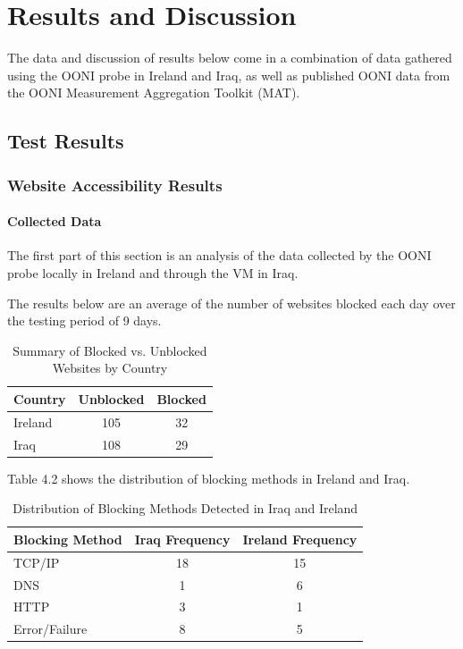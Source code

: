 \chapter{Results and Discussion}

The data and discussion of results below come in a combination of data gathered using the OONI probe in Ireland and Iraq, as well as published OONI data from the OONI Measurement Aggregation Toolkit (MAT).

\section{Test Results}

\subsection{Website Accessibility Results}

\subsubsection{Collected Data}

The first part of this section is an analysis of the data collected by the OONI probe locally in Ireland and through the VM in Iraq.

The results below are an average of the number of websites blocked each day over the testing period of 9 days.

\begin{table}[H]
\centering
\caption{Summary of Blocked vs. Unblocked Websites by Country}
\begin{tabular}{lcc}
\toprule
\textbf{Country} & \textbf{Unblocked} & \textbf{Blocked} \\
\midrule
Ireland & 105 & 32 \\
Iraq    & 108 & 29 \\   
\bottomrule
\end{tabular}
\label{tab:blocked_summary}
\end{table}

Table 4.2 shows the distribution of blocking methods in Ireland and Iraq.

\begin{table}[H]
\centering
\caption{Distribution of Blocking Methods Detected in Iraq and Ireland}
\begin{tabular}{lcc}
\toprule
\textbf{Blocking Method} & \textbf{Iraq Frequency} & \textbf{Ireland Frequency} \\
\midrule
TCP/IP         & 18 & 15 \\
DNS            & 1  & 6  \\
HTTP           & 3  & 1  \\
Error/Failure  & 8  & 5  \\
\bottomrule
\end{tabular}
\label{tab:blocking_methods_comparison}
\end{table}

